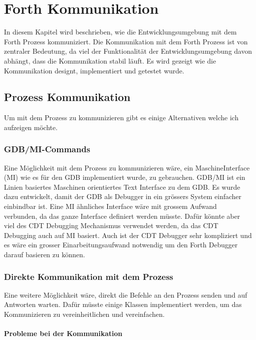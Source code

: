 \chapter{Forth Kommunikation}
\label{forthcommunication}

In diesem Kapitel wird beschrieben, wie die Entwicklungsumgebung mit dem Forth Prozess kommuniziert. Die Kommunikation mit dem Forth Prozess ist von zentraler Bedeutung, da viel der Funktionalität der Entwicklungsumgebung davon abhängt, dass die Kommunikation stabil läuft. Es wird gezeigt wie die Kommunikation designt, implementiert und getestet wurde.

\section{Prozess Kommunikation}
Um mit dem Prozess zu kommunizieren gibt es einige Alternativen welche ich aufzeigen möchte.

\subsection{GDB/MI-Commands}

Eine Möglichkeit mit dem Prozess zu kommunizieren wäre, ein MaschineInterface (MI) wie es für den GDB implementiert wurde, zu gebrauchen. GDB/MI ist ein Linien basiertes Maschinen orientiertes Text Interface zu dem GDB. Es wurde dazu entwickelt, damit der GDB als Debugger in ein grössers System einfacher einbindbar ist.\cite{gdb} Eine MI ähnliches Interface wäre mit grossem Aufwand verbunden, da das ganze Interface definiert werden müsste. Dafür könnte aber viel des CDT Debugging Mechanismus verwendet werden, da das CDT Debugging auch auf MI basiert. Auch ist der CDT Debugger sehr kompliziert und es wäre ein grosser Einarbeitungsaufwand notwendig um den Forth Debugger darauf basieren zu können.\cite{mieclipse}

\subsection{Direkte Kommunikation mit dem Prozess}

Eine weitere Möglichkeit wäre, direkt die Befehle an den Prozess senden und auf Antworten warten. Dafür müsste einige Klassen implementiert werden, um das Kommunizieren zu vereinheitlichen und vereinfachen.

\subsubsection{Probleme bei der Kommunikation}

